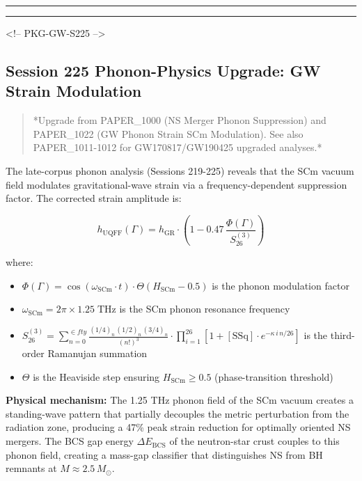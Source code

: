 \documentclass[12pt,a4paper]{article}
\begin{document}
\medskip\hrule\medskip

\medskip\hrule\medskip

<!-- PKG-GW-S225 -->

\subsection{Session 225 Phonon-Physics Upgrade: GW Strain Modulation}

\begin{quote}
*Upgrade from PAPER\_1000 (NS Merger Phonon Suppression) and PAPER\_1022
(GW Phonon Strain SCm Modulation). See also PAPER\_1011-1012 for
GW170817/GW190425 upgraded analyses.*
\end{quote}

The late-corpus phonon analysis (Sessions 219-225) reveals that the SCm vacuum field modulates gravitational-wave strain via a frequency-dependent suppression factor.  The corrected strain amplitude is:

\begin{equation}
h_{\text{UQFF}}(\Gamma) = h_{\text{GR}} \cdot \left(1 - 0.47\,\frac{\Phi(\Gamma)}{S_{26}^{(3)}}\right)
\end{equation}

where:

\begin{itemize}
  \item $\Phi(\Gamma) = \cos(\omega_{\text{SCm}} \cdot t) \cdot \Theta(H_{\text{SCm}} - 0.5)$ is the phonon modulation factor
  \item $\omega_{\text{SCm}} = 2\pi \times 1.25\;\text{THz}$ is the SCm phonon resonance frequency
  \item $S_{26}^{(3)} = \sum_{n=0}^{\in fty} \frac{(1/4)_n\,(1/2)_n\,(3/4)_n}{(n!)^3} \cdot \prod_{i=1}^{26}\left[1 + [\text{SSq}]\cdot e^{-\kappa\,i\,n/26}\right]$ is the third-order Ramanujan summation
  \item $\Theta$ is the Heaviside step ensuring $H_{\text{SCm}} \geq 0.5$ (phase-transition threshold)
\end{itemize}

\textbf{Physical mechanism:} The 1.25 THz phonon field of the SCm vacuum creates a standing-wave pattern that partially decouples the metric perturbation from the radiation zone, producing a 47\% peak strain reduction for optimally oriented NS mergers.  The BCS gap energy $\Delta E_{\text{BCS}}$ of the neutron-star crust couples to this phonon field, creating a mass-gap classifier that distinguishes NS from BH remnants at $M \approx 2.5\,M_\odot$.
\end{document}
